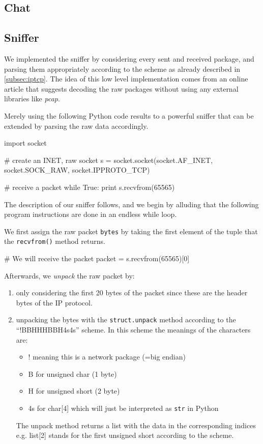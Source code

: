 \documentclass[11pt, a4paper]{article}
\begin{document}
\subsection{Chat}

\subsection{Sniffer}

We implemented the sniffer by considering every sent and received
package, and parsing them appropriately according to the scheme as
already described in \ref{subsec:iptcp}. The idea of this low level
implementation comes from an online article \cite{sniffer_py} that
suggests decoding the raw packages without using any external
libraries like \textit{pcap}.

Merely using the following Python code results to a powerful sniffer
that can be extended by parsing the raw data accordingly. 

\begin{python}
import socket
 
# create an INET, raw socket
s = socket.socket(socket.AF_INET, socket.SOCK_RAW, socket.IPPROTO_TCP)

# receive a packet
while True:
  print s.recvfrom(65565)
\end{python}

The description of our sniffer follows, and we begin by alluding that
the following program instructions are done in an endless while loop.

We first assign the raw packet \lstinline|bytes| by taking the first
element of the tuple that the \lstinline|recvfrom()| method returns. 

\begin{python}
# We will receive the packet 
packet = s.recvfrom(65565)[0]
\end{python}

Afterwards, we \textit{unpack} the raw packet by:

\begin{enumerate}
  \item only considering the first 20 bytes of the packet since these
    are the header bytes of the IP protocol. 
  \item unpacking the bytes with the \lstinline|struct.unpack|
    method according to the ``!BBHHHBBH4s4s'' scheme. In this scheme
    the meanings of the characters are:
    
    \begin{itemize}
      \item ! meaning this is a network package (=big endian)
      \item B for unsigned char (1 byte)
      \item H for unsigned short (2 byte)
      \item 4s for char[4] which will just be interpreted as
        \lstinline|str| in Python
    \end{itemize}
    The unpack method returns a list with the data in the
    corresponding indices e.g. list[2] stands for the first unsigned
    short according to the scheme. 
\end{enumerate}
\end{document}
